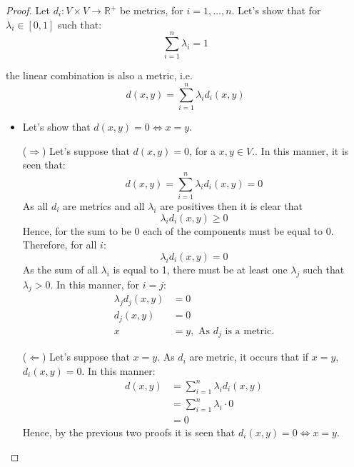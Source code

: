 \documentclass[11pt]{article}
\theoremstyle{definition}
\theoremstyle{remark}
\theoremstyle{remark}
\theoremstyle{remark}
\newcommand{\R}{{\mathbb{R}}}
\begin{document}
\begin{proof}
  Let $d_{i}: V \times V \rightarrow \R^{+}$ be metrics, for $i = 1,\ldots,n$.
  Let's show that for $\lambda_{i} \in [0, 1]$ such that:
  \begin{equation*}
    \sum_{i=1}^{n}\lambda_{i} = 1
  \end{equation*}

  the linear combination is also a metric, i.e.
  \begin{equation*}
    d(x, y) = \sum_{i=1}^{n}\lambda_{i}d_{i}(x,y)
  \end{equation*}

  \begin{itemize}
    \item Let's show that $d(x,y) = 0 \iff x = y$.

      ($\Rightarrow$) Let's suppose that $d(x,y) = 0$, for a $x,y \in V$.. In
      this manner, it is seen that:
      \begin{equation*}
        d(x,y) = \sum_{i = 1}^{n} \lambda_{i}d_{i}(x,y) = 0
      \end{equation*}
      As all $d_{i}$ are metrics and all $\lambda_{i}$ are positives then it is
      clear that
      \begin{equation*}
        \lambda_{i}d_{i}(x,y) \ge 0
      \end{equation*}
      Hence, for the sum to be 0 each of the components must be equal to 0.
      Therefore, for all $i$:
      \begin{equation*}
        \lambda_{i}d_{i}(x, y) = 0
      \end{equation*}
      As the sum of all $\lambda_{i}$ is equal to 1, there must be at least one
      $\lambda_{j}$ such that $\lambda_{j} > 0$. In this manner, for $i = j$:
      \begin{align*}
        \lambda_{j}d_{j}(x, y) &= 0 \\
        d_{j}(x, y) &= 0 \\
        x &= y, \text{ As } d_{j} \text{ is a metric.}
      \end{align*}

      ($\Leftarrow$) Let's suppose that $x = y$. As $d_{i}$ are metric, it
      occurs that if $x = y$, $d_{i}(x, y) = 0$. In this manner:
      \begin{align*}
        d(x,y) &= \sum_{i = 1}^{n}\lambda_{i}d_{i}(x, y) \\
               &= \sum_{i=1}^{n} \lambda_{i} \cdot 0 \\
               &= 0
      \end{align*}
      Hence, by the previous two proofs it is seen that
      $d_{i}(x,y) = 0 \iff x = y$.


\end{itemize}
\end{proof}
\end{document}

